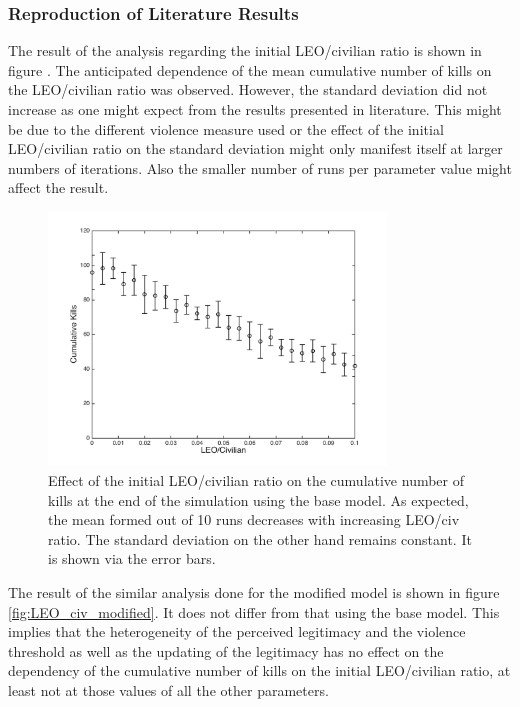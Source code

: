 \documentclass[11pt]{article}
\begin{document}
\subsubsection{Reproduction of Literature Results}
The result of the analysis regarding the initial LEO/civilian ratio is shown in figure \label{fig:LEO_civ_base}. The anticipated dependence of the mean cumulative number of kills on the LEO/civilian ratio was observed. However, the standard deviation did not increase as one might expect from the results presented in literature. This might be due to the different violence measure used or the effect of the initial LEO/civilian ratio on the standard deviation might only manifest itself at larger numbers of iterations. Also the smaller number of runs per parameter value might affect the result.
\begin{figure}[!htbp]
	\centering
		\includegraphics[width=0.80\textwidth]{../../code/base_model/cum_kills_vs_LEO_civ.png}
	\caption{Effect of the initial LEO/civilian ratio on the cumulative number of kills at the end of the simulation using the base model. As expected, the mean formed out of 10 runs decreases with increasing LEO/civ ratio. The standard deviation on the other hand remains constant. It is shown via the error bars.}
	\label{fig:LEO_civ_base}
\end{figure}
The result of the similar analysis done for the modified model is shown in figure \ref{fig:LEO_civ_modified}. It does not differ from that using the base model. This implies that the heterogeneity of the perceived legitimacy and the violence threshold as well as the updating of the legitimacy has no effect on the dependency of the cumulative number of kills on the initial LEO/civilian ratio, at least not at those values of all the other parameters. 
\end{document}
